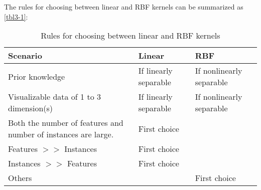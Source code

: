 The rules for choosing between linear and RBF kernels can be summarized as \autoref{tbl3-1}:
\begin{table}
    \centering
    \caption{Rules for choosing between linear and RBF kernels}
    \label{tbl3-1}
    \begin{tabularx}{\textwidth}{Xll}
        \hline
        Scenario                                                        & Linear                & RBF                      \\
        \hline
        Prior knowledge                                                 & If linearly separable & If nonlinearly separable \\
        Visualizable data of 1 to 3 dimension(s)                        & If linearly separable & If nonlinearly separable \\
        Both the number of features and number of instances are  large. & First choice          &                          \\
        Features $>>$ Instances                                         & First choice          &                          \\
        Instances $>>$ Features                                         & First choice          &                          \\
        Others                                                          &                       & First choice             \\
        \hline
    \end{tabularx}
\end{table}